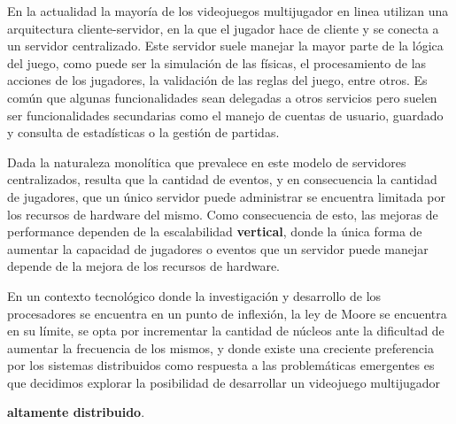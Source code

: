
\noindent En la actualidad la mayoría de los videojuegos multijugador en linea
utilizan una arquitectura cliente-servidor, en la que el jugador
hace de cliente y se conecta a un servidor centralizado. Este servidor suele manejar
la mayor parte de la lógica del juego, como puede ser la simulación de las físicas, el procesamiento
de las acciones de los jugadores, la validación de las reglas del juego, entre otros.
Es común que algunas funcionalidades sean delegadas a otros servicios pero suelen ser funcionalidades
secundarias como el manejo de cuentas de usuario, guardado y consulta de estadísticas
o la gestión de partidas.

Dada la naturaleza monolítica que prevalece en este modelo de servidores centralizados,
resulta que la cantidad de eventos, y en consecuencia la cantidad de jugadores,
que un único servidor puede administrar se encuentra limitada por los recursos de hardware del mismo.
Como consecuencia de esto, las mejoras de performance dependen de la escalabilidad \textbf{vertical},
donde la única forma de aumentar la capacidad de jugadores o eventos que un servidor puede manejar
depende de la mejora de los recursos de hardware.

En un contexto tecnológico donde la investigación y desarrollo de los procesadores
se encuentra en un punto de inflexión, la ley de Moore se encuentra en su límite,
se opta por incrementar la cantidad de núcleos ante la dificultad de aumentar la frecuencia de los mismos,
y donde existe una creciente preferencia por los sistemas distribuidos como  respuesta a las problemáticas
emergentes es que decidimos explorar la posibilidad de desarrollar un videojuego multijugador

\textbf{altamente distribuido}.



